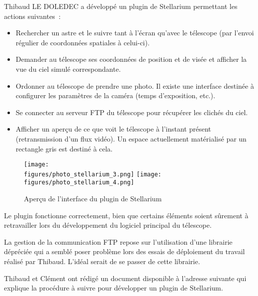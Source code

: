 Thibaud LE DOLEDEC a développé un plugin de Stellarium permettant les actions suivantes~:
\begin{itemize}[label=$\bullet$]
	\item Rechercher un astre et le suivre tant à l'écran qu'avec le télescope (par l'envoi régulier de coordonnées spatiales à celui-ci).
	\item Demander au télescope ses coordonnées de position et de visée et afficher la vue du ciel simulé correspondante.
	\item Ordonner au télescope de prendre une photo. Il existe une interface destinée à configurer les paramètres de la caméra (temps d'exposition, etc.).
	\item Se connecter au serveur FTP du télescope pour récupérer les clichés du ciel.
	\item Afficher un aperçu de ce que voit le télescope à l'instant présent (retransmission d'un flux vidéo). Un espace actuellement matérialisé par un rectangle gris est destiné à cela.
	\end{itemize}

\vspace{1cm}

\begin{figure}[H]
    \centering
    \texttt{[image: \\figures/photo\_stellarium\_3.png]}
    \texttt{[image: \\figures/photo\_stellarium\_4.png]}
    \decoRule
    \caption[
    Aperçu de l'interface du plugin de Stellarium]{
    Aperçu de l'interface du plugin de Stellarium}
    \label{fig:Aperçu de l'interface du plugin de Stellarium}
    \end{figure}

\vspace{1cm}

Le plugin fonctionne correctement, bien que certains éléments soient sûrement à retravailler lors du développement du logiciel principal du télescope.

La gestion de la communication FTP repose sur l'utilisation d'une librairie dépréciée  qui a semblé poser problème lors des essais de déploiement du travail réalisé par Thibaud. L'idéal serait de se passer de cette librairie.

\vspace{1cm}

Thibaud et Clément ont rédigé un document disponible à l'adresse suivante qui explique la procédure à suivre pour développer un plugin de Stellarium.

{\href{https://github.com/thibaudledo/Autoscope/blob/latex/Tutoriel_Stellarium.pdf}{}}
